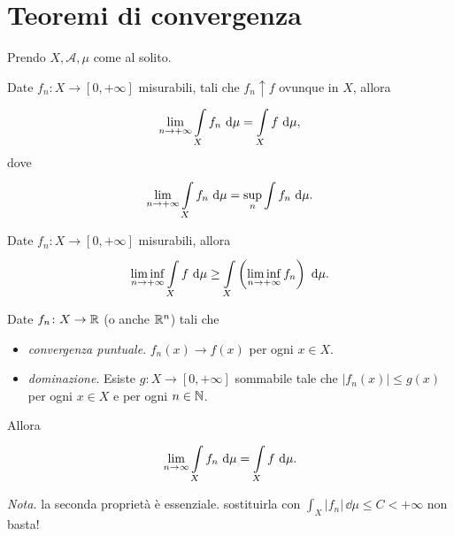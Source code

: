 \documentclass[a4paper, 11pt]{report}
\begin{document}
\section{Teoremi di convergenza}
Prendo $X, \mathcal{A}, \mu$ come al solito.
%
\begin{teorema}
Date $f_n \colon  X \to [0,+\infty]$ misurabili, tali che $f_n \uparrow f$ ovunque in $X$, allora
\[
	\lim_{n \to +\infty} \int\limits_{\mathclap{X}}^{} f_n \, \dd \mu = \int\limits_X f \, \dd \mu,
\] 
dove
\[
	\lim_{n \to +\infty} \int\limits_{\mathclap{X}}^{} f_n \, \dd \mu = \sup_n \int f_n \, \dd \mu.
\] 
\end{teorema}
%
\begin{teorema}
Date $f_n \colon X \to [0,+\infty]$ misurabili, allora
\[
	\liminf_{n \to +\infty} \int\limits_X f \, \dd \mu \geq \int\limits_{\mathclap{X}}^{} \left( \liminf_{n \to +\infty} f_n \right) \, \dd \mu.
\] 
\end{teorema}
%
\begin{teorema}
Date $f_n \colon  X \to \mathbb R$ (o anche $\mathbb R^n$) tali che
%
\begin{itemize}
	\item[] \textit{convergenza puntuale}. $f_n (x) \to f(x)$ per ogni $x \in X$.
	\item[] \textit{dominazione}. Esiste $g \colon X \to [0,+\infty]$ sommabile tale che $\left| f_n (x) \right| \leq g(x)$ per ogni $x \in X$ e per ogni $n \in \mathbb N$.
\end{itemize}
Allora
\[
	\lim_{n \to \infty} \int\limits_{\mathclap{X}}^{} f_n \, \dd \mu = \int\limits_X f \, \dd \mu. 
\] 
\end{teorema}
%
\textit{Nota.}
la seconda proprietà è essenziale. sostituirla con $\int_X \left| f_n \right| \, \dd \mu \leq C < + \infty$ non basta!
\end{document}
